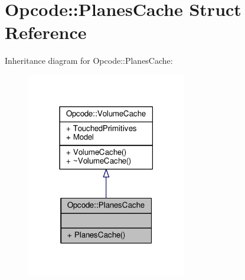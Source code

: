 \hypertarget{structOpcode_1_1PlanesCache}{}\section{Opcode\+:\+:Planes\+Cache Struct Reference}
\label{structOpcode_1_1PlanesCache}


Inheritance diagram for Opcode\+:\+:Planes\+Cache\+:
\nopagebreak
\begin{figure}[H]
\begin{center}
\leavevmode
\includegraphics[width=198pt]{d0/dc4/structOpcode_1_1PlanesCache__inherit__graph}
\end{center}
\end{figure}


